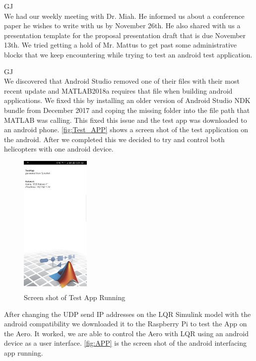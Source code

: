 \documentclass[fontsize=11pt, %
                             paper=letter, %
                             openany, %
                             captions=tableheading,
                             index=totoc,
                             hyperref]{labbook}
\begin{document}
\begin{addmargin}[0cm]{0cm}
GJ\\
We had our weekly meeting with Dr. Miah.  He informed us about a conference paper he wishes to write with us by November 26th.  He also shared with us a presentation template for the proposal presentation draft that is due November 13th.  We tried getting a hold of Mr. Mattus to get past some administrative blocks that we keep encountering while trying to test an android test application.

GJ\\
We discovered that Android Studio removed one of their files with their most recent update and MATLAB2018a requires that file when building android applications.  We fixed this by installing an older version of Android Studio NDK bundle from December 2017 and coping the missing folder into the file path that MATLAB was calling.  This fixed this issue and the test app was downloaded to an android phone.  \autoref{fig:Test_APP} shows a screen shot of the test application on the android.  After we completed this we decided to try and control both helicopters with one android device.
\begin{figure}
  \centering
  \includegraphics[width=0.3\textwidth]{figs/img/Screenshot_TestApp}
  \caption{Screen shot of Test App Running}
  \label{fig:Test_APP}
\end{figure}
After changing the UDP send IP addresses on the LQR Simulink model with the android compatibility we downloaded it to the Raspberry Pi to test the App on the Aero.  It worked, we are able to control the Aero with LQR using an android device as a user interface.  \autoref{fig:APP} is the screen shot of the android interfacing app running.

\end{addmargin}
\end{document}
